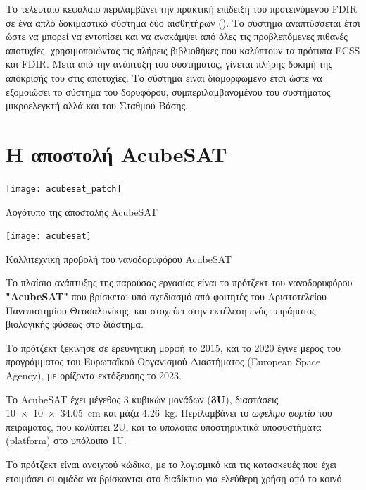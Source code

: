\documentclass[a4paper,nobib]{tufte-book}
\begin{document}
Το τελευταίο κεφάλαιο περιλαμβάνει την πρακτική επίδειξη του προτεινόμενου \acs{FDIR} σε ένα απλό δοκιμαστικό σύστημα δύο αισθητήρων (). Το σύστημα αναπτύσσεται έτσι ώστε να μπορεί να εντοπίσει και να ανακάμψει από όλες τις προβλεπόμενες πιθανές αποτυχίες, χρησιμοποιώντας τις πλήρεις βιβλιοθήκες που καλύπτουν τα πρότυπα \acs{ECSS} και \acs{FDIR}. Μετά από την ανάπτυξη του συστήματος, γίνεται πλήρης δοκιμή της απόκρισής του στις αποτυχίες. Το σύστημα είναι διαμορφωμένο έτσι ώστε να εξομοιώσει το σύστημα του δορυφόρου, συμπεριλαμβανομένου του συστήματος μικροελεγκτή αλλά και του Σταθμού Βάσης.

\chapter{Η αποστολή AcubeSAT}
\label{cap:acubesat}

\begin{marginfigure}
	\texttt{[image: acubesat\_patch]}
	\caption{Λογότυπο της αποστολής AcubeSAT}
\end{marginfigure}

\begin{marginfigure}
	\centering
	\texttt{[image: acubesat]}
	\caption{Καλλιτεχνική προβολή του νανοδορυφόρου AcubeSAT}
\end{marginfigure}

Το πλαίσιο ανάπτυξης της παρούσας εργασίας είναι το πρότζεκτ του νανοδορυφόρου \textbf{"AcubeSAT"} που βρίσκεται υπό σχεδιασμό από φοιτητές του Αριστοτελείου Πανεπιστημίου Θεσσαλονίκης, και στοχεύει στην εκτέλεση ενός πειράματος βιολογικής φύσεως στο διάστημα.

Το πρότζεκτ ξεκίνησε σε ερευνητική μορφή το 2015, και το 2020 έγινε μέρος του προγράμματος  του Ευρωπαϊκού Οργανισμού Διαστήματος (European Space Agency), με ορίζοντα εκτόξευσης το 2023.

Το AcubeSAT έχει μέγεθος 3 κυβικών μονάδων (\textbf{3U}), διαστάσεις \SI[product-units = single]{10 x 10 x 34.05}{\centi\metre} και μάζα \SI{4.26}{\kilogram}. Περιλαμβάνει το \emph{ωφέλιμο φορτίο} του πειράματος, που καλύπτει 2U, και τα υπόλοιπα υποστηρικτικά υποσυστήματα (platform) στο υπόλοιπο 1U.

Το πρότζεκτ είναι ανοιχτού κώδικα, με το λογισμικό και τις κατασκευές που έχει ετοιμάσει οι ομάδα να βρίσκονται στο διαδίκτυο για ελεύθερη χρήση από το κοινό. 
\end{document}
